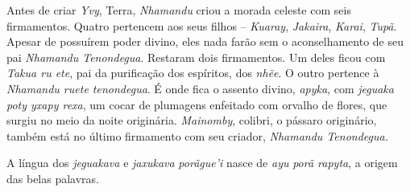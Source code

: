 Antes de criar \emph{Yvy}, Terra, \emph{Nhamandu} criou a morada celeste
com seis firmamentos. Quatro pertencem aos seus filhos --
\emph{Kuaray}, \emph{Jakaira}, \emph{Karai}, \emph{Tupã}. Apesar de
possuírem poder divino, eles nada farão sem o aconselhamento de seu pai
\emph{Nhamandu Tenondegua}. Restaram dois firmamentos. Um deles ficou
com \emph{Takua ru ete}, pai da purificação dos espíritos, dos
\emph{nhẽe}. O outro pertence à \emph{Nhamandu ruete tenondegua}. É onde
fica o assento divino, \emph{apyka}, com \emph{jeguaka poty yxapy rexa},
um cocar de plumagens enfeitado com orvalho de flores, que surgiu no
meio da noite originária. \emph{Mainomby}, colibri, o pássaro
originário, também está no último firmamento com seu criador,
\emph{Nhamandu Tenondegua.} 

A língua dos \emph{jeguakava} e \emph{jaxukava} \emph{porãgue'i} nasce
de \emph{ayu} \emph{porã rapyta}, a origem das belas palavras.


 
